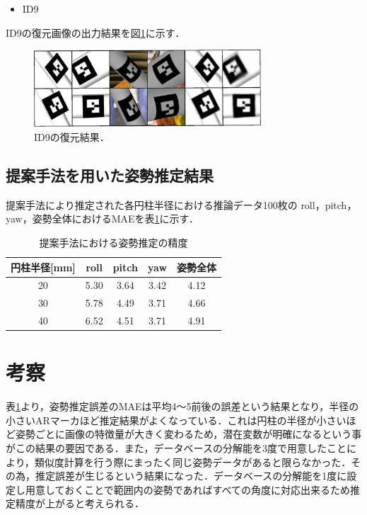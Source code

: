 \begin{itemize}
\item  ID9
\end{itemize}

ID9の復元画像の出力結果を図\ref{i9}に示す．

      \begin{figure}[htbp]
      \begin{center}
      \includegraphics[width=85mm]{figure/eps/F10.eps}
      \caption{ID9の復元結果．}
      \label{i9}
      \end{center}
      \end{figure}


\subsection{提案手法を用いた姿勢推定結果}
提案手法により推定された各円柱半径における推論データ100枚の
roll，pitch，yaw，姿勢全体におけるMAEを表\ref{hyouka}に示す．



\begin{table}[h]
        \vspace{0zh}
          \begin{center}
            \caption{提案手法における姿勢推定の精度}
            \label{hyouka}
            \begin{tabular}{c|c|c|c|c} \hline
              円柱半径[mm]   & roll& pitch & yaw&姿勢全体 \\ \hline
              20& 5.30 & 3.64 & 3.42&4.12 \\ \hline
              30&5.78 & 4.49 & 3.71& 4.66 \\ \hline
              40&6.52 &4.51  &3.71&4.91 \\ \hline
              \end{tabular}
          \end{center}
        \vspace{-1.0zh}
\end{table}





\section{考察}
表\ref{hyouka}より，姿勢推定誤差のMAEは平均4～5前後の誤差という結果となり，半径の小さいARマーカほど推定結果がよくなっている．これは円柱の半径が小さいほど姿勢ごとに画像の特徴量が大きく変わるため，潜在変数が明確になるという事がこの結果の要因である．また，データベースの分解能を3度で用意したことにより，類似度計算を行う際にまったく同じ姿勢データがあると限らなかった．その為，推定誤差が生じるという結果になった．データベースの分解能を1度に設定し用意しておくことで範囲内の姿勢であればすべての角度に対応出来るため推定精度が上がると考えられる．

